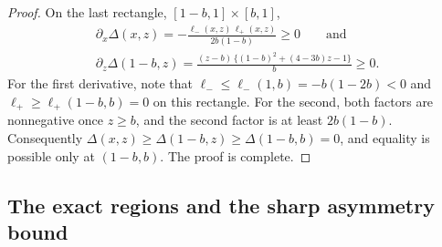 \documentclass[11pt,a4paper]{article}
\theoremstyle{remark}
\newcommand{\1}{\mathbf{1}}
\begin{document}
\begin{proof}
On the last rectangle, $[1-b,1]\times[b,1]$,
\begin{gather*}
  \partial_x\Delta(x,z)=-\frac{\ell_-(x,z)\,\ell_+(x,z)}{2b(1-b)}\ge0
  \qquad\text{and}\\
  \partial_z\Delta(1-b,z)=\frac{(z-b)\,\bigl\{(1-b)^2+(4-3b)z-1\bigr\}}{b}\ge0.
\end{gather*}
For the first derivative, note that $\ell_-\le\ell_-(1,b)=-b(1-2b)<0$ and $\ell_+\ge\ell_+(1-b,b)=0$ on this rectangle.
For the second, both factors are nonnegative once $z\ge b$, and the second factor is at least $2b(1-b)$.
Consequently $\Delta(x,z)\ge\Delta(1-b,z)\ge\Delta(1-b,b)=0$, and equality is possible only at $(1-b,b)$.
The proof is complete.
\end{proof}

\subsection{The exact regions and the sharp asymmetry bound}
\label{sec:eta-proof}
\end{document}
